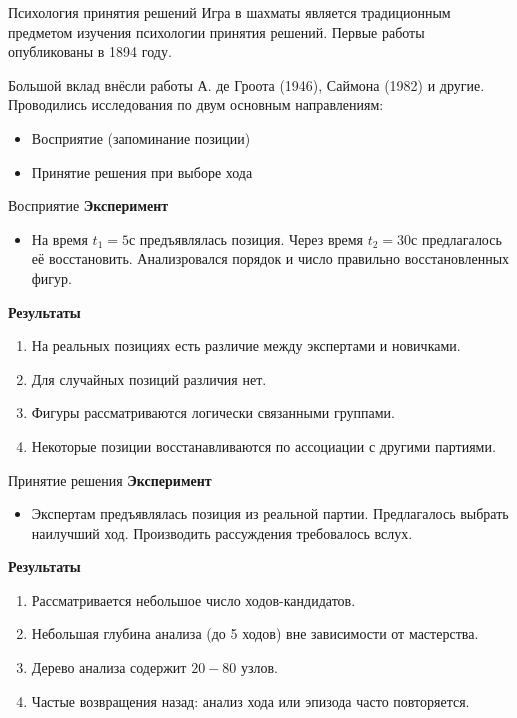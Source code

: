\begin{frame}{Психология принятия решений} 
Игра в шахматы является традиционным предметом изучения психологии принятия решений. Первые работы опубликованы в 1894 году. 

\bigskip
Большой вклад внёсли работы А. де Гроота (1946), Саймона (1982) и другие. Проводились исследования по двум основным направлениям:
\begin{itemize}
\item Восприятие (запоминание позиции)
\item Принятие решения при выборе хода
\end{itemize} 
\end{frame}

\begin{frame}{Восприятие}
\textbf{Эксперимент} 
\begin{itemize}
\item На время $t_1 = 5$с предъявлялась позиция. Через время $t_2 = 30$с предлагалось её восстановить. Анализровался порядок и число правильно восстановленных фигур. 
\end{itemize}
\textbf{Результаты}
\begin{enumerate}
\item На реальных позициях есть различие между экспертами и новичками.
\item Для случайных позиций различия нет.
\item Фигуры рассматриваются логически связанными группами.
\item Некоторые позиции восстанавливаются по ассоциации с другими партиями.
\end{enumerate}
\end{frame}


\begin{frame}{Принятие решения}
\textbf{Эксперимент}
\begin{itemize}
\item Экспертам предъявлялась позиция из реальной партии. Предлагалось выбрать наилучший ход. Производить рассуждения требовалось вслух.   
\end{itemize}
\textbf{Результаты}
\begin{enumerate}
\item Рассматривается небольшое число ходов-кандидатов.
\item Небольшая глубина анализа (до 5 ходов) вне зависимости от мастерства.
\item Дерево анализа содержит $20-80$ узлов. 
\item Частые возвращения назад: анализ хода или эпизода часто повторяется.  
\end{enumerate}
\end{frame}

